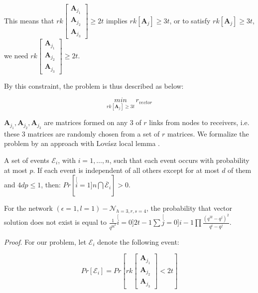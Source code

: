 This means that $rk\left[\begin{array}{c}
\boldsymbol{A}_{j_{1}}\\
\boldsymbol{A}_{j_{2}}\\
\boldsymbol{A}_{j_{3}}
\end{array}\right]\geq2t$ implies $rk\left[\boldsymbol{A}_{j}\right]\geq3t$, or to satisfy
$rk\left[\boldsymbol{A}_{j}\right]\geq3t$, we need $rk\left[\begin{array}{c}
\boldsymbol{A}_{j_{1}}\\
\boldsymbol{A}_{j_{2}}\\
\boldsymbol{A}_{j_{3}}
\end{array}\right]\geq2t$.

By this constraint, the problem is thus described as below:

\[
\underset{rk\left[\boldsymbol{A}_{j}\right]\geq3t}{min}\,r_{vector}
\]

$\boldsymbol{A}_{j_{1}},\boldsymbol{A}_{j_{2}},\boldsymbol{A}_{j_{3}}$
are matrices formed on any 3 of $r$ links from nodes to receivers,
i.e. these 3 matrices are randomly chosen from a set of $r$ matrices.
We formalize the problem by an approach with Lov\'asz local lemma
\cite{MosheSchwartz:2018}.
\begin{lem}
 \cite{Schwarz:2013} A set of events $\mathcal{E}_{i}$, with $i=1,\ldots,n$,
such that each event occurs with probability at most $p$. If each
event is independent of all others except for at most $d$ of them
and $4dp\leq1$, then: $Pr\left[\stackrel[i=1]{n}{\bigcap}\overline{\mathcal{E}}_{i}\right]>0$.
\label{thm:LLL}
\end{lem}
%
\begin{lem}
For the network $\left(\epsilon=1,l=1\right)-\mathcal{N}_{h=3,r,s=4}$,
the probability that vector solution does not exist is equal to $\frac{1}{q^{9t^{2}}}\stackrel[i=0]{2t-1}{\mathop{\sum}}\stackrel[j=0]{i-1}{\mathop{\prod}}\frac{\left(q^{3t}-q^{j}\right)^{2}}{q^{i}-q^{j}}$.
\label{lem:prob_p_LLL_formula}
\end{lem}
\textit{Proof}. For our problem, let $\mathcal{E}_{i}$ denote the
following event:

\[
Pr\left[\mathcal{E}_{i}\right]=Pr\left[rk\left[\begin{array}{c}
\boldsymbol{A}_{j_{1}}\\
\boldsymbol{A}_{j_{2}}\\
\boldsymbol{A}_{j_{3}}
\end{array}\right]<2t\right]
\]

